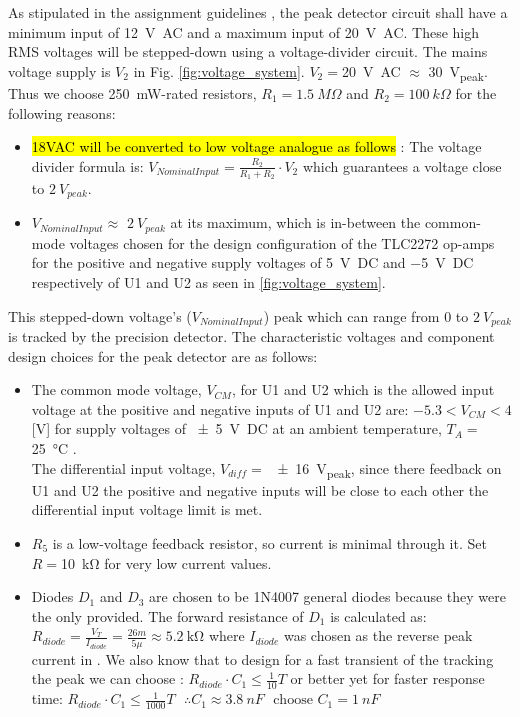 As stipulated in the assignment guidelines \cite{assignment_2}, the peak detector circuit shall have a minimum input of  \SI{12}{\volt AC} and a maximum input of \SI{20}{\volt AC}. These high RMS voltages will be stepped-down using a voltage-divider circuit. The mains voltage supply is $V_2$ in Fig. \ref{fig:voltage_system}. $V_2=$\SI{20}{\volt AC} $\approx$ \SI{30}{\volt_{peak}}. Thus we choose \SI{250}{\milli\watt}-rated resistors, $R_1=1.5\ M\Omega$ and $R_2=100 \ k\Omega$ for the following reasons:

\begin{itemize}
    \item \hl{18VAC will be converted to low voltage analogue as follows
    }: The voltage divider formula is: $V_{Nominal Input}=\frac{R_2}{R_1+R_2}\cdot V_{2}$ which guarantees a voltage close to $2 \ V_{peak}$.
    \item $V_{Nominal Input}\approx$ $2 \ V_{peak}$ at its maximum, which is in-between the common-mode voltages chosen for the design configuration of the TLC2272 \cite{TLC2272} op-amps for the positive and negative supply voltages of \SI{+5}{\volt DC} and \SI{-5}{\volt DC} respectively of U1 and U2 as seen in \ref{fig:voltage_system}.
\end{itemize}

This stepped-down voltage's ($V_{Nominal Input}$) peak which can range from 0 to $2 \ V_{peak}$ is tracked by the precision detector. The characteristic voltages and component design choices for the peak detector are as follows:
\begin{itemize}
  \item The common mode voltage, $V_{CM}$, for U1 and U2 which is the allowed input voltage at the positive and negative inputs of U1 and U2 are: $-5.3<V_{CM}<4$ [V] for supply voltages of \SI{+-5}{\volt DC}
  at an ambient temperature, $T_A=$\SI{25}{\degreeCelsius} \cite{TLC2272}.\\The differential input voltage, $V_{diff}=$ \SI{+-16}{V_{peak}}, since there feedback on U1 and U2 the positive and negative inputs will be close to each other the differential input voltage limit is met.
  \item $R_5$ is a low-voltage feedback resistor, so current is minimal through it. Set $R=$\SI{10}{\kilo\ohm} for very low current values.
  \item Diodes $D_1$ and $D_3$ are chosen to be 1N4007 general diodes because they were the only provided. The forward resistance of $D_1$ is calculated as: $R_{diode}=\frac{V_T}{I_{diode}}=\frac{26m}{5\mu}\approx\SI{5.2}{\kilo\ohm}$
  where $I_{diode}$ was chosen as the reverse peak current in
  \cite{1N4007}. We also know that to design for a fast transient of the tracking the peak we can choose \cite{voltage_peak_detector}: $R_{diode}\cdot C_1 \leq \frac{1}{10}T$ or better yet for faster response time: $R_{diode}\cdot C_1 \leq \frac{1}{1000}T \ \ \ \therefore C_1\approx3.8 \ nF \ \ \ \text{choose } C_1=1\ nF$
\end{itemize}


